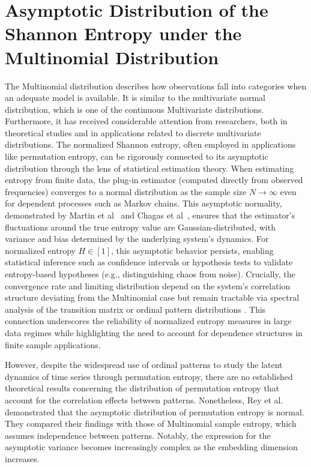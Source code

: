 \section {Asymptotic Distribution of the Shannon Entropy under the Multinomial Distribution}

The Multinomial distribution describes how observations fall into categories when an adequate model is available. It is similar to the multivariate normal distribution, which is one of the continuous Multivariate distributions. Furthermore, it has received considerable attention from researchers, both in theoretical studies and in applications related to discrete multivariate distributions. 
The normalized Shannon entropy, often employed in applications like permutation entropy, can be rigorously connected to its asymptotic distribution through the lens of statistical estimation theory. When estimating entropy from finite data, the plug-in estimator (computed directly from observed frequencies) converges to a normal distribution as the sample size $N\longrightarrow \infty$ even for dependent processes such as Markov chains. 
This asymptotic normality, demonstrated by Martin et al~\cite{PhysRevE.103.022215} 
and Chagas et al~\cite{Chagas2022}, ensures that the estimator’s fluctuations around the true entropy value are Gaussian-distributed, with variance and bias determined by the underlying system’s dynamics. 
For normalized entropy $H \in [1]$, this asymptotic behavior persists, enabling statistical inference such as confidence intervals or hypothesis tests to validate entropy-based hypotheses (e.g., distinguishing chaos from noise). 
Crucially, the convergence rate and limiting distribution depend on the system’s correlation structure deviating from the Multinomial case but remain tractable via spectral analysis of the transition matrix or ordinal pattern distributions \cite{PhysRevE.103.022215,Chagas2022}. This connection underscores the reliability of normalized entropy measures in large data regimes while highlighting the need to account for dependence structures in finite sample applications.

However, despite the widespread use of ordinal patterns to study the latent dynamics of time series through permutation entropy, there are no established theoretical results concerning the distribution of permutation entropy that account for the correlation effects between patterns. Nonetheless, Rey et al. \cite{Rey2023a} demonstrated that the asymptotic distribution of permutation entropy is normal. They compared their findings with those of Multinomial sample entropy, which assumes independence between patterns. Notably, the expression for the asymptotic variance becomes increasingly complex as the embedding dimension increases. 

